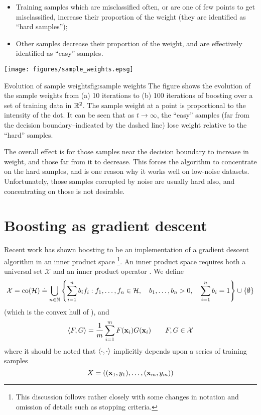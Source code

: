 \begin{itemize}
\item	Training samples which are misclassified often, or are one of 
	few points to get misclassified, increase their proportion of
	the weight (they are identified as ``hard samples'');
\item	Other samples decrease their proportion of the weight, and are
	effectively identified as ``easy'' samples.
\end{itemize}

\begin{linefigure}
\begin{center}
\texttt{[image: figures/sample\_weights.epsg]}
\end{center}
\begin{capt}{Evolution of sample weights}{fig:sample weights}
The figure shows the evolution of the sample weights from (a) 10
iterations to (b) 100 iterations of boosting over a set of training
data in $\mathbb{R}^2$.  The sample weight at a point is proportional to the
intensity of the dot.  It can be seen that as $t \rightarrow \infty$,
the ``easy'' samples (far from the decision boundary--indicated by the
dashed line) lose weight relative to the ``hard'' samples.
\end{capt}
\end{linefigure}

The overall effect is for those samples near the decision boundary to
increase in weight, and those far from it to decrease.  This forces
the algorithm to concentrate on the hard samples, and is one reason
why it works well on low-noise datasets.  Unfortunately, those samples
corrupted by noise are usually hard also, and concentrating on those
is not desirable.


\section{Boosting as gradient descent}
\label{sec:theory:gradient descent}

Recent work has shown boosting to be an implementation of a gradient
descent algorithm in an inner product space
\cite{Mason99}
\footnote{This discussion follows \cite{Mason99} rather closely with
some changes in notation and omission of details such as stopping
criteria.}.
An inner product space requires both a universal set $\mathcal{X}$ and
an inner product operator \ip{\cdot}{\cdot}.  We define
%
\begin{equation}
\mathcal{X} = 
\mathrm{co} (\mathcal{H}) \doteq
 \bigcup _{n \in \mathbb{N}}
\left\{
 \sum_{i=1}^{n}
  b_i
f_i : f_1, \ldots, f_n \in \mathcal{H}, \quad
 b_1, \ldots, b_n > 0, \quad
 \sum_{i=1}^{n} b_i = 1
\right\} \cup \{ \emptyset \}
\end{equation}
%
(which is the convex hull of \calH), and
%
\begin{equation}
\langle {F} , {G} \rangle = \frac{1}{m} \sum_{i=1}^{m} F(\mathbf{x}_i)G(\mathbf{x}_i) \qquad
F, G \in \mathcal{X}
\label{eqn:inner product definition}
\end{equation}
%
where it should be noted that $\langle {\cdot} , {\cdot} \rangle$ implicitly depends
upon a series of training samples
%
\begin{equation}
X = ((\mathbf{x}_1, y_1), \ldots, (\mathbf{x}_m, y_m))
\end{equation}

